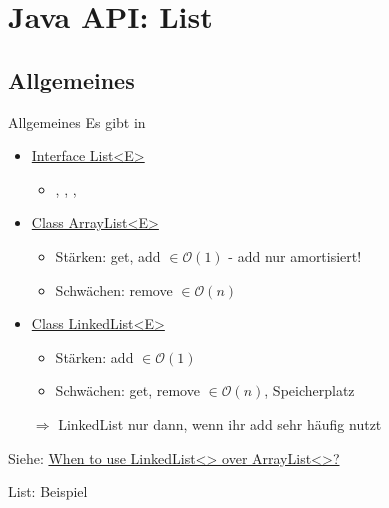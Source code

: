 \documentclass[usepdftitle=false,hyperref={pdfpagelabels=false}]{beamer}
\begin{document}
\section{Java API: List}
\subsection{Allgemeines}
\begin{frame}{Allgemeines}
    Es gibt in 
    \begin{itemize}[<+->]
        \item \href{http://docs.oracle.com/javase/7/docs/api/java/util/List.html}{Interface List<E>}
        \begin{itemize}
            \item {}, , , 
        \end{itemize}

        \item \href{http://docs.oracle.com/javase/7/docs/api/java/util/ArrayList.html}{Class ArrayList<E>}
        \begin{itemize}
            \item Stärken: get, add $\in \mathcal{O}(1)$ - add nur amortisiert!
            \item Schwächen: remove $\in \mathcal{O}(n)$
        \end{itemize}

        \item \href{http://docs.oracle.com/javase/7/docs/api/java/util/LinkedList.html}{Class LinkedList<E>}
        \begin{itemize}
            \item Stärken: add $\in \mathcal{O}(1)$
            \item Schwächen: get, remove $\in \mathcal{O}(n)$, Speicherplatz
        \end{itemize}
        \item[$\Rightarrow$] LinkedList nur dann, wenn ihr add sehr häufig nutzt
    \end{itemize}

    Siehe: \href{http://stackoverflow.com/q/322715/562769}{When to use LinkedList<> over ArrayList<>?}
\end{frame}

\begin{frame}{List: Beispiel}
    \inputminted[linenos=true, numbersep=5pt, tabsize=4, fontsize=\tiny]{java}{ListExample.java}
\end{frame}
\end{document}
